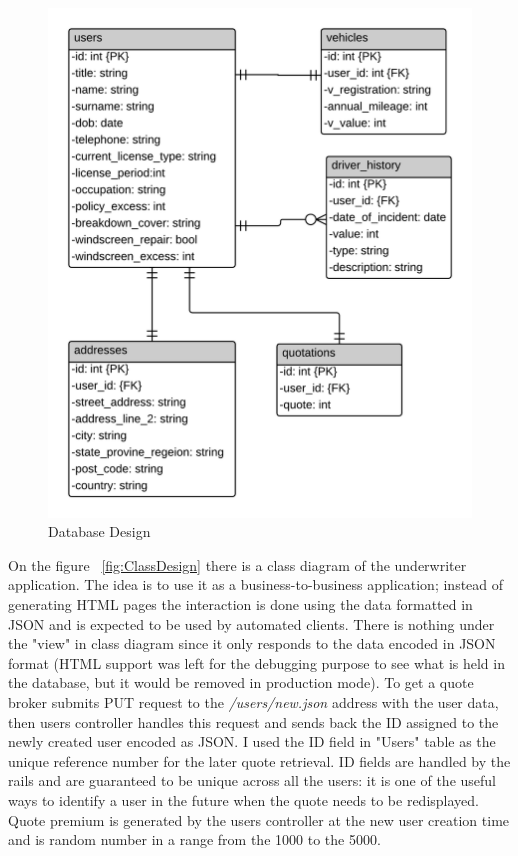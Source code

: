 \documentclass[10pt,a4paper,headinclude=true,twoside]{report}
\begin{document}
\begin{figure}[H]
\centering
\centerline{\includegraphics[scale=0.198]{./DatabaseDesign}}
\caption{Database Design}
\label{fig:DatabaseDesign}
\end{figure}

On the figure ~\ref{fig:ClassDesign} there is a class diagram of the underwriter application. The idea is to use it as a business-to-business application; instead of generating HTML pages the interaction is done using the data formatted in JSON and is expected to be used by automated clients. There is nothing under the "view" in class diagram since it only responds to the data encoded in JSON format (HTML support was left for the debugging purpose to see what is held in the database, but it would be removed in production mode). To get a quote broker submits PUT request to the \textit{/users/new.json} address with the user data, then users controller handles this request and sends back the ID assigned to the newly created user encoded as JSON. I used the ID field in "Users" table as the unique reference number for the later quote retrieval. ID fields are handled by the rails and are guaranteed to be unique across all the users: it is one of the useful ways to identify a user in the future when the quote needs to be redisplayed. Quote premium is generated by the users controller at the new user creation time and is random number in a range from the 1000 to the 5000.
\end{document}
